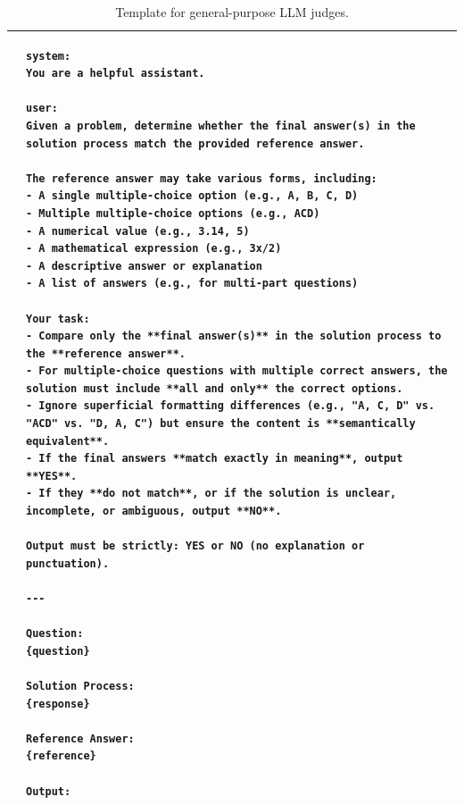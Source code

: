 \begin{table}
\centering
\footnotesize
\begin{tabular}{lp{12cm}}
\toprule

&
\begin{lstlisting}[basicstyle=\ttfamily\scriptsize, breaklines=true, aboveskip=0pt, belowskip=0pt]
system:
You are a helpful assistant.

user:
Given a problem, determine whether the final answer(s) in the solution process match the provided reference answer.

The reference answer may take various forms, including:
- A single multiple-choice option (e.g., A, B, C, D)
- Multiple multiple-choice options (e.g., ACD)
- A numerical value (e.g., 3.14, 5)
- A mathematical expression (e.g., 3x/2)
- A descriptive answer or explanation
- A list of answers (e.g., for multi-part questions)

Your task:
- Compare only the **final answer(s)** in the solution process to the **reference answer**.
- For multiple-choice questions with multiple correct answers, the solution must include **all and only** the correct options.
- Ignore superficial formatting differences (e.g., "A, C, D" vs. "ACD" vs. "D, A, C") but ensure the content is **semantically equivalent**.
- If the final answers **match exactly in meaning**, output **YES**.
- If they **do not match**, or if the solution is unclear, incomplete, or ambiguous, output **NO**.

Output must be strictly: YES or NO (no explanation or punctuation).

---

Question:  
{question}

Solution Process:  
{response}

Reference Answer:  
{reference}

Output:
\end{lstlisting}
\\
\bottomrule
\end{tabular}
\caption{Template for general-purpose LLM judges.}
\label{tab:appendix:grade_template_general}
\end{table}





